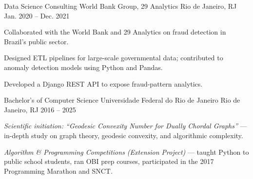 \documentclass[11pt, a4paper]{awesome-cv}
\begin{document}
\begin{cventries}
  \cventry
    {Data Science Consulting}
    {World Bank Group, 29 Analytics}
    {Rio de Janeiro, RJ}
    {Jan. 2020 -- Dec. 2021}
    {
      \begin{cvitems}
        \item {Collaborated with the World Bank and 29 Analytics on fraud detection in Brazil's public sector.}
        \item {Designed ETL pipelines for large-scale governmental data; contributed to anomaly detection models using Python and Pandas.}
        \item {Developed a Django REST API to expose fraud-pattern analytics.}
      \end{cvitems}
    }

\end{cventries}

\begin{cventries}

  \cventry
    {Bachelor's of Computer Science}
    {Universidade Federal do Rio de Janeiro}
    {Rio de Janeiro, RJ}
    {2016 -- 2025}
    {
      \begin{cvitems}
        \item {\textit{Scientific initiation: ``Geodesic Convexity Number for Dually Chordal Graphs''} --- in-depth study on graph theory, geodesic convexity, and algorithmic complexity.}
        \item {\textit{Algorithm \& Programming Competitions (Extension Project)} --- taught Python to public school students, ran OBI prep courses, participated in the 2017 Programming Marathon and SNCT.}
      \end{cvitems}
    }

\end{cventries}

\begin{cvskills}
\end{cvskills}
\end{document}
